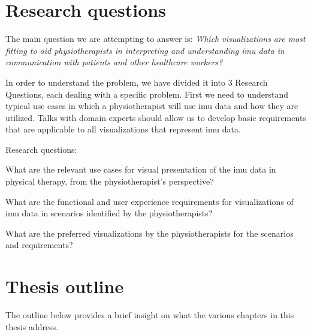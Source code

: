 \section{Research questions}
The main question we are attempting to answer is: \textit{Which visualizations are most fitting to aid physiotherapists in interpreting and understanding \gls{imu} data in communication with patients and other healthcare workers?}

In order to understand the problem, we have divided it into 3 Research Questions, each dealing with a specific problem. First we need to understand typical use cases in which a physiotherapist will use \gls{imu} data and how they are utilized. Talks with domain experts should allow us to develop basic requirements that are applicable to all visualizations that represent \gls{imu} data.

Research questions:
\vspace{-15pt}
\begin{description}[parsep=0pt, itemsep=0pt]
\item[Research Question 1:] What are the relevant use cases for visual presentation of the \gls{imu} data in physical therapy, from the physiotherapist's perspective?

\item[Research Question 2:] What are the functional and user experience requirements for visualizations of \gls{imu} data in scenarios identified by the physiotherapists?

\item[Research Question 3:] What are the preferred visualizations by the physiotherapists for the scenarios and requirements?
\end{description}

\section{Thesis outline}
The outline below provides a brief insight on what the various chapters in this thesis address.


